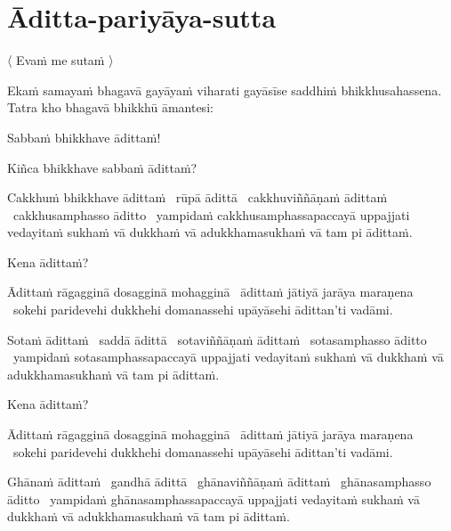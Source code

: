 \section{Āditta-pariyāya-sutta}
\label{aditta-pariyaya}

\begin{leader}
  〈 Evaṁ me sutaṁ 〉
\end{leader}

\begin{pali-hang}
  Ekaṁ samayaṁ bhagavā gayāyaṁ viharati gayāsīse saddhiṁ bhikkhusahassena. Tatra kho bhagavā bhikkhū āmantesi:
\end{pali-hang}

Sabbaṁ bhikkhave ādittaṁ!

Kiñca bhikkhave sabbaṁ ādittaṁ?

\begin{pali-hang}
  Cakkhuṁ bhikkhave ādittaṁ \breathmark\ rūpā ādittā \breathmark\ cakkhuviññāṇaṁ ādittaṁ \breathmark\ cakkhusamphasso āditto \breathmark\ yampidaṁ cakkhusamphassapaccayā uppajjati vedayitaṁ sukhaṁ vā dukkhaṁ vā adukkhamasukhaṁ vā tam pi ādittaṁ.
\end{pali-hang}

Kena ādittaṁ?

\begin{pali-hang}
  Ādittaṁ rāgagginā dosagginā mohagginā \breathmark\ ādittaṁ jātiyā jarāya maraṇena \breathmark\ sokehi paridevehi dukkhehi domanassehi upāyāsehi ādittan'ti vadāmi.
\end{pali-hang}

\begin{pali-hang}
  Sotaṁ ādittaṁ \breathmark\ saddā ādittā \breathmark\ sotaviññāṇaṁ ādittaṁ \breathmark\ sotasamphasso āditto \breathmark\ yampidaṁ sotasamphassapaccayā uppajjati vedayitaṁ sukhaṁ vā dukkhaṁ vā adukkhamasukhaṁ vā tam pi ādittaṁ.
\end{pali-hang}

Kena ādittaṁ?

\begin{pali-hang}
  Ādittaṁ rāgagginā dosagginā mohagginā \breathmark\ ādittaṁ jātiyā jarāya maraṇena \breathmark\ sokehi paridevehi dukkhehi domanassehi upāyāsehi ādittan'ti vadāmi.
\end{pali-hang}

\begin{pali-hang}
  Ghānaṁ ādittaṁ \breathmark\ gandhā ādittā \breathmark\ ghānaviññāṇaṁ ādittaṁ \breathmark\ ghānasamphasso āditto \breathmark\ yampidaṁ ghānasamphassapaccayā uppajjati vedayitaṁ sukhaṁ vā dukkhaṁ vā adukkhamasukhaṁ vā tam pi ādittaṁ.
\end{pali-hang}

